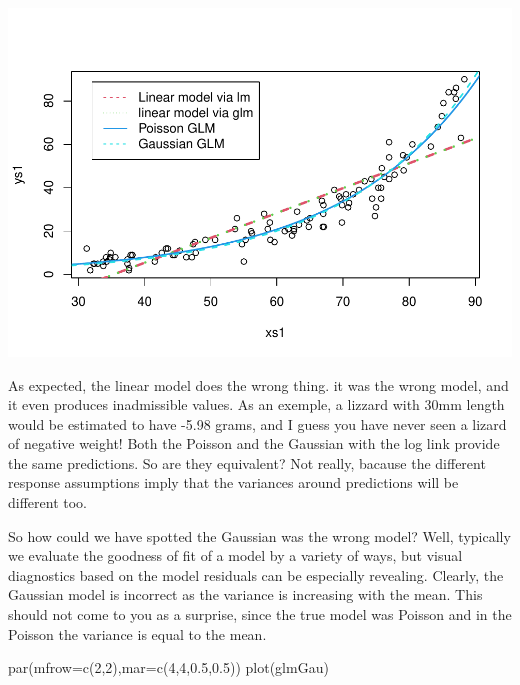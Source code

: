 \documentclass[
]{book}
\newenvironment{Shaded}{\begin{snugshade}}{\end{snugshade}}
\newcommand{\AttributeTok}[1]{\textcolor[rgb]{0.77,0.63,0.00}{#1}}
\newcommand{\DecValTok}[1]{\textcolor[rgb]{0.00,0.00,0.81}{#1}}
\newcommand{\FloatTok}[1]{\textcolor[rgb]{0.00,0.00,0.81}{#1}}
\newcommand{\FunctionTok}[1]{\textcolor[rgb]{0.00,0.00,0.00}{#1}}
\newcommand{\NormalTok}[1]{#1}
\begin{document}
\includegraphics{ECOMODbook_files/figure-latex/glm4-1.pdf}

As expected, the linear model does the wrong thing. it was the wrong model, and it even produces inadmissible values. As an exemple, a lizzard with 30mm length would be estimated to have -5.98 grams, and I guess you have never seen a lizard of negative weight! Both the Poisson and the Gaussian with the log link provide the same predictions. So are they equivalent? Not really, bacause the different response assumptions imply that the variances around predictions will be different too.

So how could we have spotted the Gaussian was the wrong model? Well, typically we evaluate the goodness of fit of a model by a variety of ways, but visual diagnostics based on the model residuals can be especially revealing. Clearly, the Gaussian model is incorrect as the variance is increasing with the mean. This should not come to you as a surprise, since the true model was Poisson and in the Poisson the variance is equal to the mean.

\begin{Shaded}
\begin{Highlighting}[]
\FunctionTok{par}\NormalTok{(}\AttributeTok{mfrow=}\FunctionTok{c}\NormalTok{(}\DecValTok{2}\NormalTok{,}\DecValTok{2}\NormalTok{),}\AttributeTok{mar=}\FunctionTok{c}\NormalTok{(}\DecValTok{4}\NormalTok{,}\DecValTok{4}\NormalTok{,}\FloatTok{0.5}\NormalTok{,}\FloatTok{0.5}\NormalTok{))}
\FunctionTok{plot}\NormalTok{(glmGau)}
\end{Highlighting}
\end{Shaded}
\end{document}
